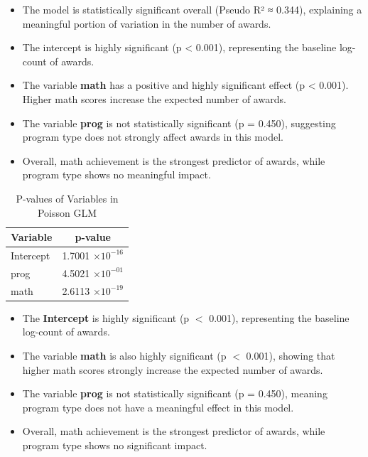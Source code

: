 \documentclass[12pt,a4paper]{report}
\begin{document}
\begin{tcolorbox}[colback=yellow!5!white,colframe=yellow!60!black,title=Interpretation]
\begin{itemize}
    \item The model is statistically significant overall (Pseudo R² ≈ 0.344), explaining a meaningful portion of variation in the number of awards.
    \item The intercept is highly significant (p < 0.001), representing the baseline log-count of awards.
    \item The variable \textbf{math} has a positive and highly significant effect (p < 0.001). Higher math scores increase the expected number of awards.
    \item The variable \textbf{prog} is not statistically significant (p = 0.450), suggesting program type does not strongly affect awards in this model.
    \item Overall, math achievement is the strongest predictor of awards, while program type shows no meaningful impact.
\end{itemize}
\end{tcolorbox}
\begin{table}[h!]
\centering
\begin{tabular}{|l|c|}
\hline
\textbf{Variable} & \textbf{p-value} \\ \hline
Intercept & 1.7001 $\times 10^{-16}$ \\ \hline
prog      & 4.5021 $\times 10^{-01}$ \\ \hline
math      & 2.6113 $\times 10^{-19}$ \\ \hline
\end{tabular}
\caption{P-values of Variables in Poisson GLM}
\label{tab:pvalues_glm}
\end{table}
\begin{tcolorbox}[colback=blue!5!white,colframe=blue!60!black,title=Interpretation]
\begin{itemize}
    \item The \textbf{Intercept} is highly significant (p $<$ 0.001), representing the baseline log-count of awards.
    \item The variable \textbf{math} is also highly significant (p $<$ 0.001), showing that higher math scores strongly increase the expected number of awards.
    \item The variable \textbf{prog} is not statistically significant (p = 0.450), meaning program type does not have a meaningful effect in this model.
    \item Overall, math achievement is the strongest predictor of awards, while program type shows no significant impact.
\end{itemize}
\end{tcolorbox}
\clearpage
\end{document}
